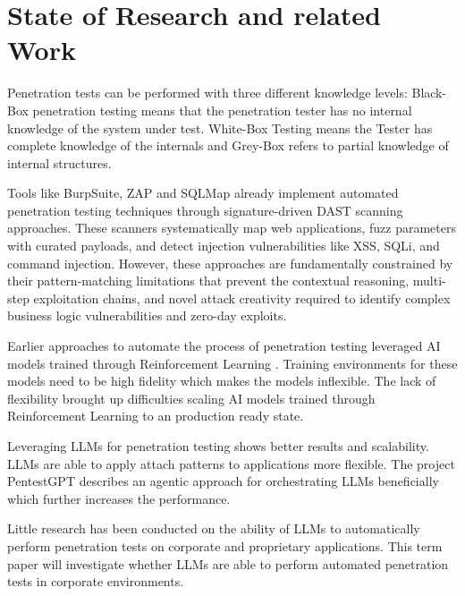 \chapter{State of Research and related Work}
\label{ch:foundations_related_work}

\noindent Penetration tests can be performed with three different knowledge levels: Black-Box penetration testing means that the penetration tester has no internal knowledge of the system under test. White-Box Testing means the Tester has complete knowledge of the internals and Grey-Box refers to partial knowledge of internal structures. \cite{Rane_2024}

Tools like BurpSuite, ZAP and SQLMap already implement automated penetration testing techniques through signature-driven \ac{DAST} scanning approaches. These scanners systematically map web applications, fuzz parameters with curated payloads, and detect injection vulnerabilities like XSS, SQLi, and command injection. However, these approaches are fundamentally constrained by their pattern-matching limitations that prevent the contextual reasoning, multi-step exploitation chains, and novel attack creativity required to identify complex business logic vulnerabilities and zero-day exploits. \cite{Osman_2025}

Earlier approaches to automate the process of penetration testing leveraged \ac{AI} models trained through Reinforcement Learning \cite{Confido_2022}. Training environments for these models need to be high fidelity which makes the models inflexible. The lack of flexibility brought up difficulties scaling \ac{AI} models trained through Reinforcement Learning to an production ready state. \cite{Schwartz_2019}

Leveraging \ac{LLM}s for penetration testing shows better results and scalability. \ac{LLM}s are able to apply attach patterns to applications more flexible. The project PentestGPT describes an agentic approach for orchestrating \ac{LLM}s beneficially which further increases the performance. \cite{Deng_2024}

Little research has been conducted on the ability of \ac{LLM}s to automatically perform penetration tests on corporate and proprietary applications. This term paper will investigate whether \ac{LLM}s are able to perform automated penetration tests in corporate environments.